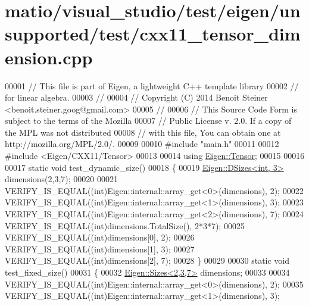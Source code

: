 \hypertarget{matio_2visual__studio_2test_2eigen_2unsupported_2test_2cxx11__tensor__dimension_8cpp_source}{}\section{matio/visual\+\_\+studio/test/eigen/unsupported/test/cxx11\+\_\+tensor\+\_\+dimension.cpp}
\label{matio_2visual__studio_2test_2eigen_2unsupported_2test_2cxx11__tensor__dimension_8cpp_source}

\begin{DoxyCode}
00001 \textcolor{comment}{// This file is part of Eigen, a lightweight C++ template library}
00002 \textcolor{comment}{// for linear algebra.}
00003 \textcolor{comment}{//}
00004 \textcolor{comment}{// Copyright (C) 2014 Benoit Steiner <benoit.steiner.goog@gmail.com>}
00005 \textcolor{comment}{//}
00006 \textcolor{comment}{// This Source Code Form is subject to the terms of the Mozilla}
00007 \textcolor{comment}{// Public License v. 2.0. If a copy of the MPL was not distributed}
00008 \textcolor{comment}{// with this file, You can obtain one at http://mozilla.org/MPL/2.0/.}
00009 
00010 \textcolor{preprocessor}{#include "main.h"}
00011 
00012 \textcolor{preprocessor}{#include <Eigen/CXX11/Tensor>}
00013 
00014 \textcolor{keyword}{using} \hyperlink{class_eigen_1_1_tensor}{Eigen::Tensor};
00015 
00016 
00017 \textcolor{keyword}{static} \textcolor{keywordtype}{void} test\_dynamic\_size()
00018 \{
00019   \hyperlink{struct_eigen_1_1_d_sizes}{Eigen::DSizes<int, 3>} dimensions(2,3,7);
00020 
00021   VERIFY\_IS\_EQUAL((\textcolor{keywordtype}{int})Eigen::internal::array\_get<0>(dimensions), 2);
00022   VERIFY\_IS\_EQUAL((\textcolor{keywordtype}{int})Eigen::internal::array\_get<1>(dimensions), 3);
00023   VERIFY\_IS\_EQUAL((\textcolor{keywordtype}{int})Eigen::internal::array\_get<2>(dimensions), 7);
00024   VERIFY\_IS\_EQUAL((\textcolor{keywordtype}{int})dimensions.TotalSize(), 2*3*7);
00025   VERIFY\_IS\_EQUAL((\textcolor{keywordtype}{int})dimensions[0], 2);
00026   VERIFY\_IS\_EQUAL((\textcolor{keywordtype}{int})dimensions[1], 3);
00027   VERIFY\_IS\_EQUAL((\textcolor{keywordtype}{int})dimensions[2], 7);
00028 \}
00029 
00030 \textcolor{keyword}{static} \textcolor{keywordtype}{void} test\_fixed\_size()
00031 \{
00032   \hyperlink{struct_eigen_1_1_sizes}{Eigen::Sizes<2,3,7>} dimensions;
00033 
00034   VERIFY\_IS\_EQUAL((\textcolor{keywordtype}{int})Eigen::internal::array\_get<0>(dimensions), 2);
00035   VERIFY\_IS\_EQUAL((\textcolor{keywordtype}{int})Eigen::internal::array\_get<1>(dimensions), 3);

\end{DoxyCode}
